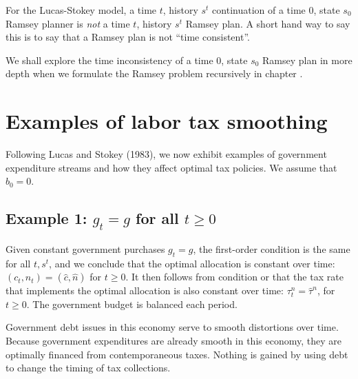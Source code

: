 \medskip

  For the Lucas-Stokey model, a time $t$, history $s^t$ continuation  of a time $0$, state $s_0$ Ramsey planner is
{\it not\/} a time $t$, history $s^t$ Ramsey plan.
A short hand way to say this is to say that
a Ramsey plan is not ``time consistent''.
%

\medskip

\noindent We shall explore the time inconsistency  of a  time  $0$, state $s_0$ Ramsey plan in more depth  %
 when we formulate
the Ramsey problem recursively in chapter .



\section{Examples of labor tax smoothing}\label{sec:labor_tax_smoothing}%
Following Lucas and Stokey (1983),
we now exhibit examples of government expenditure streams and how
they affect optimal tax policies. %
We assume that $b_0=0$.


\subsection{Example 1: $g_t=g$ for all $t\geq0$}
\label{sec:LucasStokey_ex1}%
Given  constant  government purchases $g_t=g$, the first-order condition
 is the same for all $t, s^t$, and we conclude that the
optimal allocation is constant over time: $(c_t,n_t)=(\hat c, \hat n)$
for $t\geq 0$. It then follows from condition  or
 that the tax rate
that  implements the optimal allocation is also constant over
time: $\tau^n_t=\hat \tau^n$, for $t\geq 0$.
The government budget is balanced  each period.

Government debt issues in this economy  serve to smooth
distortions over time. Because government expenditures are already smooth
in this economy, they are optimally financed from contemporaneous
taxes. Nothing is gained by using debt to change the timing of tax
collections.


